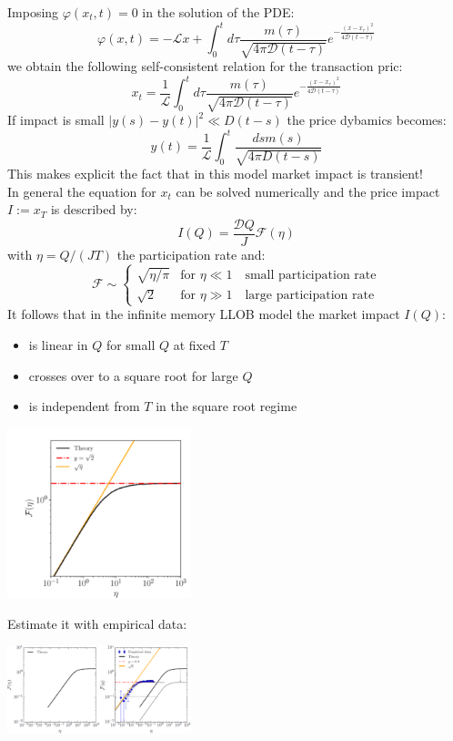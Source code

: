 Imposing $\varphi(x_t,t) =0$ in the solution of the PDE:
\[
\varphi(x,t) = - \mathcal{L}x + \int_0^t d\tau \frac{m(\tau)}{\sqrt{4\pi\mathcal{D}(t-\tau)}}e^{-\frac{(x-x_\tau)^2}{4\mathcal{D}(t-\tau)}}
\]
we obtain the following self-consistent relation for the transaction pric:
\[
x_t = \frac{1}{\mathcal{L}}\int_0^t d\tau \frac{m(\tau)}{\sqrt{4\pi\mathcal{D}(t-\tau)}}e^{-\frac{(x-x_\tau)^2}{4\mathcal{D}(t-\tau)}}
\]
If impact is small $|y(s)-y(t)|^2 \ll D(t-s)$ the price dybamics becomes:
\[
y(t) = \frac{1}{\mathcal{L}} \int_0^t \frac{ds m(s)}{\sqrt{4 \pi D(t-s)}}
\]
This makes explicit the fact that in this model market impact is transient!\\
In general the equation for $x_t$ can be solved numerically and the price impact $I:=x_T$ is described by:
\[
I(Q) = \frac{\mathcal{D}Q}{J} \mathcal{F}(\eta)
\]
with $\eta = Q/(JT)$ the participation rate and:
\[
\mathcal{F} \sim 
\begin{cases}
\sqrt{\eta/\pi} & \text{for } \eta \ll 1 \quad \text{small participation rate}\\
\sqrt{2} & \text{for } \eta \gg 1 \quad \text{large participation rate}
\end{cases}
\]
It follows that in the infinite memory LLOB model the market impact $I(Q)$:
\begin{itemize}
	\item is linear in $Q$ for small $Q$ at fixed $T$
	\item crosses over to a square root for large $Q$
	\item is independent from $T$ in the square root regime
\end{itemize}
\begin{center}
	\includegraphics[width=0.4\textwidth]{picture/(35)solution_llob.png}
\end{center}
Estimate it with empirical data:
\begin{center}
	\includegraphics[width=0.4\textwidth]{picture/(36)empirical_data_llob.png}
\end{center}
